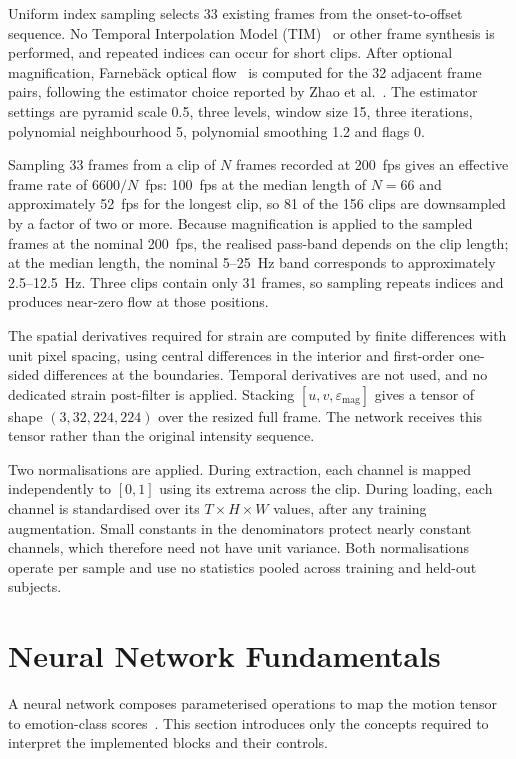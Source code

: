 Uniform index sampling selects 33 existing frames from the onset-to-offset sequence. No Temporal Interpolation Model (TIM)~\cite{pfister2011} or other frame synthesis is performed, and repeated indices can occur for short clips. After optional magnification, Farneb\"ack optical flow~\cite{farneback2003} is computed for the 32 adjacent frame pairs, following the estimator choice reported by Zhao et al.~\cite{zhaoS2021}. The estimator settings are pyramid scale 0.5, three levels, window size 15, three iterations, polynomial neighbourhood 5, polynomial smoothing 1.2 and flags 0.

Sampling 33 frames from a clip of $N$ frames recorded at 200~fps gives an effective frame rate of $6600/N$~fps: 100~fps at the median length of $N = 66$ and approximately 52~fps for the longest clip, so 81 of the 156 clips are downsampled by a factor of two or more. Because magnification is applied to the sampled frames at the nominal 200~fps, the realised pass-band depends on the clip length; at the median length, the nominal 5--25~Hz band corresponds to approximately 2.5--12.5~Hz. Three clips contain only 31 frames, so sampling repeats indices and produces near-zero flow at those positions.

The spatial derivatives required for strain are computed by finite differences with unit pixel spacing, using central differences in the interior and first-order one-sided differences at the boundaries. Temporal derivatives are not used, and no dedicated strain post-filter is applied. Stacking $[u,v,\varepsilon_{\mathrm{mag}}]$ gives a tensor of shape $(3,32,224,224)$ over the resized full frame. The network receives this tensor rather than the original intensity sequence.

Two normalisations are applied. During extraction, each channel is mapped independently to $[0,1]$ using its extrema across the clip. During loading, each channel is standardised over its $T\times H\times W$ values, after any training augmentation. Small constants in the denominators protect nearly constant channels, which therefore need not have unit variance. Both normalisations operate per sample and use no statistics pooled across training and held-out subjects.


\section{Neural Network Fundamentals}
\label{sec:nn-fundamentals}

A neural network composes parameterised operations to map the motion tensor to emotion-class scores~\cite{lecun2015,goodfellow2016}. This section introduces only the concepts required to interpret the implemented blocks and their controls.

